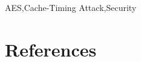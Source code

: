 \documentclass[3p]{elsarticle}
\begin{document}
\begin{frontmatter}
\begin{keyword}
AES\sep Cache-Timing Attack\sep Security
\end{keyword}

\end{frontmatter}

\linenumbers



\clearpage

\section*{References}


\end{document}
